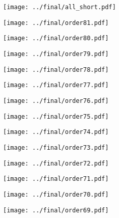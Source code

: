 \documentclass{article}
\begin{document}
\begin{figure}[H]
    \centering
    \texttt{[image: ../final/all\_short.pdf]}
\end{figure}

\begin{figure}[H]
    \centering
    \texttt{[image: ../final/order81.pdf]}
\end{figure}
\begin{figure}[H]
    \centering
    \texttt{[image: ../final/order80.pdf]}
\end{figure}
\begin{figure}[H]
    \centering
    \texttt{[image: ../final/order79.pdf]}
\end{figure}
\begin{figure}[H]
    \centering
    \texttt{[image: ../final/order78.pdf]}
\end{figure}
\begin{figure}[H]
    \centering
    \texttt{[image: ../final/order77.pdf]}
\end{figure}
\begin{figure}[H]
    \centering
    \texttt{[image: ../final/order76.pdf]}
\end{figure}
\begin{figure}[H]
    \centering
    \texttt{[image: ../final/order75.pdf]}
\end{figure}
\begin{figure}[H]
    \centering
    \texttt{[image: ../final/order74.pdf]}
\end{figure}
\begin{figure}[H]
    \centering
    \texttt{[image: ../final/order73.pdf]}
\end{figure}
\begin{figure}[H]
    \centering
    \texttt{[image: ../final/order72.pdf]}
\end{figure}
\begin{figure}[H]
    \centering
    \texttt{[image: ../final/order71.pdf]}
\end{figure}
\begin{figure}[H]
    \centering
    \texttt{[image: ../final/order70.pdf]}
\end{figure}
\begin{figure}[H]
    \centering
    \texttt{[image: ../final/order69.pdf]}
\end{figure}
\end{document}
